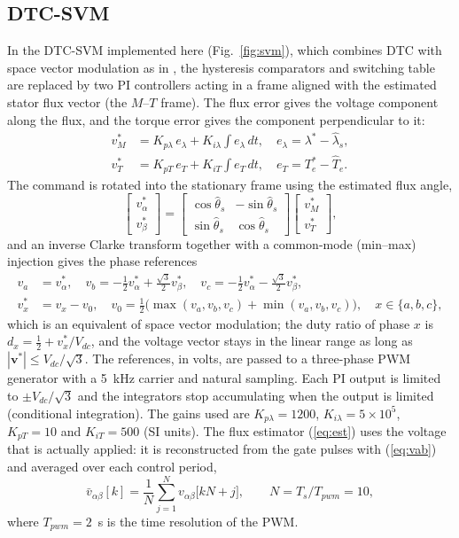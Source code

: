 \documentclass[12pt,a4paper,onecolumn]{IEEEtran}
\begin{document}
\subsection{DTC-SVM}
In the DTC-SVM implemented here (Fig.~\ref{fig:svm}), which combines DTC with space vector modulation as in \cite{habetler1992,tang2004}, the hysteresis comparators and switching table are replaced by two PI controllers acting in a frame aligned with the estimated stator flux vector (the $M$--$T$ frame). The flux error gives the voltage component along the flux, and the torque error gives the component perpendicular to it:
\begin{align}
v_M^* &= K_{p\lambda}\,e_\lambda + K_{i\lambda}\!\int e_\lambda\,dt, \quad e_\lambda = \lambda^* - \hat\lambda_s,\label{eq:pil}\\
v_T^* &= K_{pT}\,e_T + K_{iT}\!\int e_T\,dt, \quad e_T = T_e^* - \hat T_e.\label{eq:pit}
\end{align}
The command is rotated into the stationary frame using the estimated flux angle,
\begin{equation}
\begin{bmatrix} v_\alpha^*\\ v_\beta^* \end{bmatrix} = \begin{bmatrix} \cos\hat\theta_s & -\sin\hat\theta_s\\ \sin\hat\theta_s & \cos\hat\theta_s \end{bmatrix}\begin{bmatrix} v_M^*\\ v_T^* \end{bmatrix}, \label{eq:rot}
\end{equation}
and an inverse Clarke transform together with a common-mode (min--max) injection gives the phase references
\begin{align}
v_a &= v_\alpha^*,\quad v_b = -\tfrac12 v_\alpha^* + \tfrac{\sqrt3}{2}v_\beta^*,\quad v_c = -\tfrac12 v_\alpha^* - \tfrac{\sqrt3}{2}v_\beta^*, \label{eq:invclarke}\\
v_x^{*} &= v_x - v_0,\quad v_0 = \tfrac12\big(\max(v_a,v_b,v_c) + \min(v_a,v_b,v_c)\big), \quad x\in\{a,b,c\}, \label{eq:minmax}
\end{align}
which is an equivalent of space vector modulation; the duty ratio of phase $x$ is $d_x = \tfrac12 + v_x^{*}/V_{dc}$, and the voltage vector stays in the linear range as long as $|\mathbf v^*|\le V_{dc}/\sqrt3$. The references, in volts, are passed to a three-phase PWM generator with a 5~kHz carrier and natural sampling. Each PI output is limited to $\pm V_{dc}/\sqrt3$ and the integrators stop accumulating when the output is limited (conditional integration). The gains used are $K_{p\lambda}=1200$, $K_{i\lambda}=5\times10^{5}$, $K_{pT}=10$ and $K_{iT}=500$ (SI units). The flux estimator (\ref{eq:est}) uses the voltage that is actually applied: it is reconstructed from the gate pulses with (\ref{eq:vab}) and averaged over each control period,
\begin{equation}
\bar v_{\alpha\beta}[k] = \frac{1}{N}\sum_{j=1}^{N} v_{\alpha\beta}\big[kN+j\big],\qquad N = T_s/T_{pwm}=10, \label{eq:avg}
\end{equation}
where $T_{pwm}=2$~\textmu s is the time resolution of the PWM.
\end{document}
